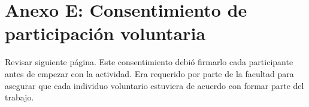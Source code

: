 \chapter{Anexo E: Consentimiento de participación voluntaria}\label{AnexoE}

Revisar siguiente página. Este consentimiento debió firmarlo cada participante antes de empezar con la actividad. Era requerido por parte de la facultad para asegurar que cada individuo voluntario estuviera de acuerdo con formar parte del trabajo.


\begin{figure}[h]
   \centering
\end{figure}

\restoregeometry